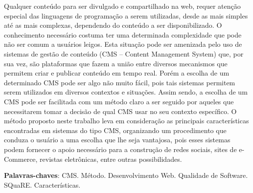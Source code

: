 \begin{resumo}

Qualquer conteúdo para ser divulgado e compartilhado na web, requer atenção especial das linguagens de programação a serem utilizadas, desde as mais simples até as mais complexas, dependendo do conteúdo a ser disponibilizado. O conhecimento necessário costuma ter uma determinada complexidade que pode não ser comum a usuários leigos. Esta situação pode ser amenizada pelo uso de sistemas de gestão de conteúdo (CMS – Content Management System) que, por sua vez, são plataformas que fazem a união entre diversos mecanismos que permitem criar e publicar conteúdo em tempo real. Porém a escolha de um determinado CMS pode ser algo não muito fácil,  pois tais sistemas permitem serem utilizados em diversos contextos e situações. Assim sendo, a escolha de um CMS pode ser facilitada com um método claro a ser seguido por aqueles que necessitarem tomar a decisão de qual CMS usar no seu contexto específico. O método proposto neste trabalho leva em consideração as principais características encontradas em sistemas do tipo CMS, organizando um procedimento que conduza o usuário a uma escolha que lhe seja vantajosa, pois esses sistemas podem fornecer o apoio necessário para a construção de redes sociais, sites de e-Commerce, revistas eletrônicas, entre outras possibilidades.  
 
 \vspace{\onelineskip}
 \noindent
 \textbf{Palavras-chaves}: CMS. Método. Desenvolvimento Web. Qualidade de Software. SQuaRE. Características.  
\end{resumo}